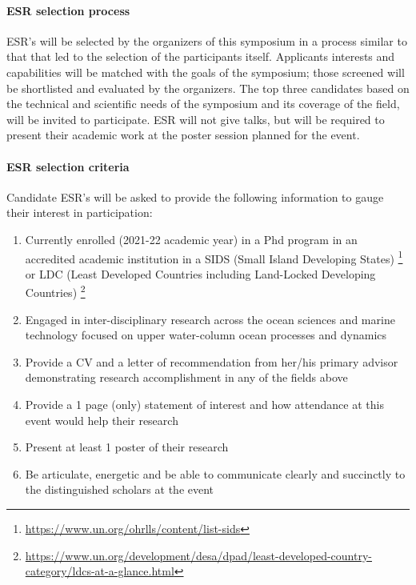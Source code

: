 \paragraph{ESR selection process} ESR's will be selected by the
organizers of this symposium in a process similar to that that led to
the selection of the participants itself. Applicants interests and
capabilities will be matched with the goals of the symposium; those
screened will be shortlisted and evaluated by the organizers. The top
three candidates based on the technical and scientific needs of the
symposium and its coverage of the field, will be invited to
participate. ESR will not give talks, but will be required to present
their academic work at the poster session planned for the event.

\paragraph{ESR selection criteria} Candidate ESR's will be asked to
provide the following information to gauge their interest in participation:

\begin{enumerate}[noitemsep,topsep=0pt,parsep=0pt,partopsep=0pt]

\item Currently enrolled (2021-22 academic year) in a Phd program in
  an accredited academic institution in a SIDS (Small Island
  Developing States) {\footnote{\url{https://www.un.org/ohrlls/content/list-sids}}} or LDC (Least Developed Countries including Land-Locked
   Developing Countries) {\footnote{\url{https://www.un.org/development/desa/dpad/least-developed-country-category/ldcs-at-a-glance.html}}}
\item Engaged in inter-disciplinary research across the ocean sciences
  and marine technology focused on upper water-column ocean processes
  and dynamics 
\item Provide a CV and a letter of recommendation from her/his primary
  advisor demonstrating research accomplishment in any of the fields
  above 
\item Provide a 1 page (only) statement of interest and how attendance
  at this event would help their research  
\item Present at least 1 poster of their research
\item Be articulate, energetic and be able to communicate clearly and
  succinctly to the distinguished scholars at the event 
\end{enumerate}  

